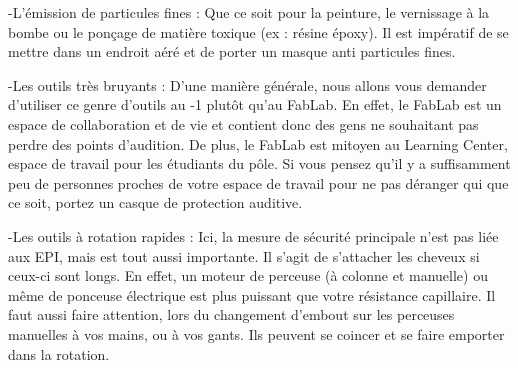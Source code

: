 \documentclass[14pt]{formation}
\begin{document}
    -L’émission de particules fines : Que ce soit pour la peinture, le vernissage à la bombe ou le ponçage de matière toxique (ex : résine époxy). Il est impératif de se mettre dans un endroit aéré et de porter un masque anti particules fines.
	
    -Les outils très bruyants : D’une manière générale, nous allons vous demander d’utiliser ce genre d’outils au -1 plutôt qu’au FabLab. En effet, le FabLab est un espace de collaboration et de vie et contient donc des gens ne souhaitant pas perdre des points d’audition. De plus, le FabLab est mitoyen au Learning Center, espace de travail pour les étudiants du pôle. Si vous pensez qu’il y a suffisamment peu de personnes proches de votre espace de travail pour ne pas déranger qui que ce soit, portez un casque de protection auditive.
	
    -Les outils à rotation rapides : Ici, la mesure de sécurité principale n’est pas liée aux EPI, mais est tout aussi importante. Il s’agit de s’attacher les cheveux si ceux-ci sont longs. En effet, un moteur de perceuse (à colonne et manuelle) ou même de ponceuse électrique est plus puissant que votre résistance capillaire. Il faut aussi faire attention, lors du changement d’embout sur les perceuses manuelles à vos mains, ou à vos gants. Ils peuvent se coincer et se faire emporter dans la rotation.

\end{document}
